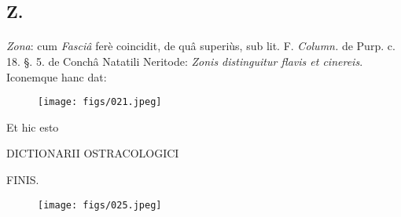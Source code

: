 \documentclass[a4paper, 11pt, oneside, polutonikogreek, german]{article}
\begin{document}
\subsection{Z.}
\paragraph{}
\emph{Zona}: cum \emph{Fasciâ} ferè coincidit, de quâ superiùs, sub lit. F. \emph{Column.} de Purp. c. 18. §. 5. de Conchâ Natatili Neritode: \emph{Zonis distinguitur flavis et cinereis}. Iconemque hanc dat:

\begin{figure}[H]
\centering
\texttt{[image: figs/021.jpeg]}
\end{figure}
\begin{center}
Et hic esto

DICTIONARII OSTRACOLOGICI

FINIS.
\end{center}
\begin{figure}[H]
\centering
\texttt{[image: figs/025.jpeg]}
\end{figure}
\clearpage
\end{document}
